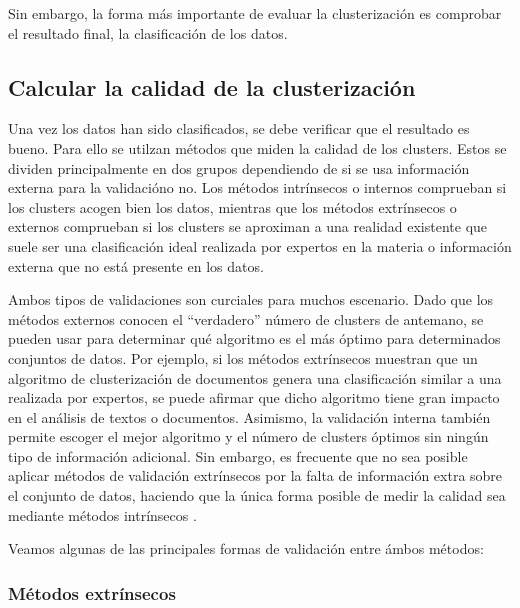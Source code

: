 \documentclass[10pt, a4paper]{article}
\begin{document}
Sin embargo, la forma más importante de evaluar la clusterización es comprobar el resultado final, la clasificación de los datos.

  
  
\subsection{\textbf{Calcular la calidad de la clusterización}}

Una vez los datos han sido clasificados, se debe verificar que el resultado es bueno. Para ello se utilzan métodos que miden la calidad de los clusters. Estos se dividen principalmente en dos grupos dependiendo de si se usa información externa para la validacióno no. Los métodos intrínsecos o internos comprueban si los clusters acogen bien los datos, mientras que los métodos extrínsecos o externos comprueban si los clusters se aproximan a una realidad existente que suele ser una clasificación ideal realizada por expertos en la materia o información externa que no está presente en los datos. 
  
Ambos tipos de validaciones son curciales para muchos escenario. Dado que los métodos externos conocen el ``verdadero''  número de clusters de antemano, se pueden usar para determinar qué algoritmo es el más óptimo para determinados conjuntos de datos. Por ejemplo, si los métodos extrínsecos muestran que un algoritmo de clusterización de documentos genera una clasificación similar a una realizada por expertos, se puede afirmar que dicho algoritmo tiene gran impacto en el análisis de textos o documentos. Asimismo, la validación interna también permite escoger el mejor algoritmo y el número de clusters óptimos sin ningún tipo de información adicional. Sin embargo, es frecuente que no sea posible aplicar métodos de validación extrínsecos por la falta de información extra sobre el conjunto de datos, haciendo que la única forma posible de medir la calidad sea mediante métodos intrínsecos \cite{otrolibro}.
  
Veamos algunas de las principales formas de validación entre ámbos métodos:
  

  
\subsubsection{\textbf{Métodos extrínsecos}}
\end{document}
